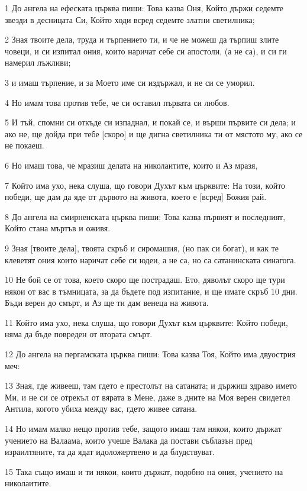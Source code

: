 \par 1 До ангела на ефеската църква пиши: Това казва Оня, Който държи седемте звезди в десницата Си, Който ходи всред седемте златни светилника;
\par 2 Зная твоите дела, труда и търпението ти, и че не можеш да търпиш злите човеци, и си изпитал ония, които наричат себе си апостоли, (а не са), и си ги намерил лъжливи;
\par 3 и имаш търпение, и за Моето име си издържал, и не си се уморил.
\par 4 Но имам това против тебе, че си оставил първата си любов.
\par 5 И тъй, спомни си откъде си изпаднал, и покай се, и върши първите си дела; и ако не, ще дойда при тебе [скоро] и ще дигна светилника ти от мястото му, ако се не покаеш.
\par 6 Но имаш това, че мразиш делата на николаитите, които и Аз мразя,
\par 7 Който има ухо, нека слуша, що говори Духът към църквите: На този, който победи, ще дам да яде от дървото на живота, което е [всред] Божия рай.
\par 8 До ангела на смирненската църква пиши: Това казва първият и последният, Който стана мъртъв и оживя.
\par 9 Зная [твоите дела], твоята скръб и сиромашия, (но пак си богат), и как те клеветят ония които наричат себе си юдеи, а не са, но са сатанинската синагога.
\par 10 Не бой се от това, което скоро ще пострадаш. Ето, дяволът скоро ще тури някои от вас в тъмницата, за да бъдете под изпитание, и ще имате скръб 10 дни. Бъди верен до смърт, и Аз ще ти дам венеца на живота.
\par 11 Който има ухо, нека слуша, що говори Духът към църквите: Който победи, няма да бъде повреден от втората смърт.
\par 12 До ангела на пергамската църква пиши: Това казва Тоя, Който има двуострия меч:
\par 13 Зная, где живееш, там гдето е престолът на сатаната; и държиш здраво името Ми, и не си се отрекъл от вярата в Мене, даже в дните на Моя верен свидетел Антила, когото убиха между вас, гдето живее сатана.
\par 14 Но имам малко нещо против тебе, защото имаш там някои, които държат учението на Валаама, които учеше Валака да постави съблазън пред израилтяните, та да ядат идоложертвено и да блудствуват.
\par 15 Така също имаш и ти някои, които държат, подобно на ония, учението на николаитите.
